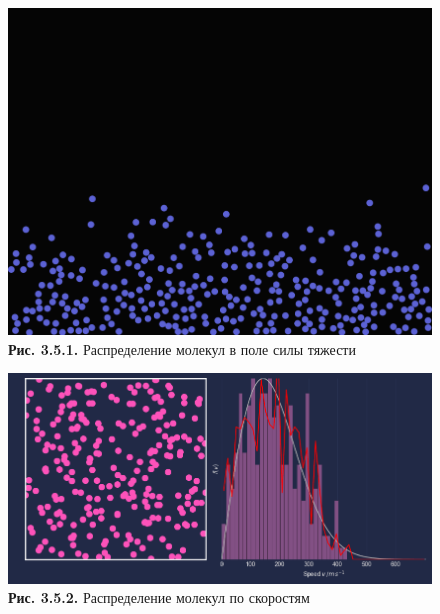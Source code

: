   \begin{figure}[ht]
 \centering
		\includegraphics[height =11 cm, keepaspectratio]{images/gravity.png}
		\caption{ \textbf{Рис. 3.5.1.} Распределение молекул в поле силы тяжести}
	\end{figure}
 \begin{figure}[ht]
 \centering
		\includegraphics[height =8 cm, keepaspectratio]{images/maxwell_boltsman.png}
		\caption{ \textbf{Рис. 3.5.2.} Распределение молекул по скоростям}

	\end{figure}

